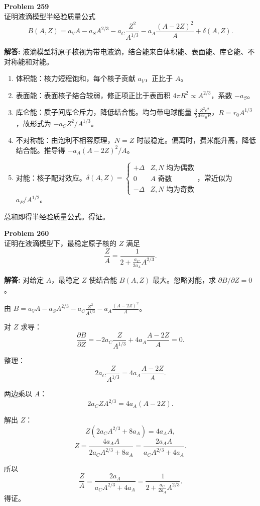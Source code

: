 \documentclass[12pt, a4paper, oneside]{ctexart}
\newenvironment{solution}{\par\noindent\textbf{解答:}\quad}{\par}
\begin{document}
\begin{mdframed}[backgroundcolor=gray!10, linewidth=0pt]
    \textbf{Problem 259} \\
    证明液滴模型半经验质量公式
    \[
    B(A, Z) = a_V A - a_S A^{2/3} - a_C \frac{Z^2}{A^{1/3}} - a_A \frac{(A-2Z)^2}{A} + \delta(A, Z).
    \]
\end{mdframed}
\begin{solution}
    液滴模型将原子核视为带电液滴，结合能来自体积能、表面能、库仑能、不对称能和对能。
    \begin{enumerate}
        \item 体积能：核力短程饱和，每个核子贡献 $a_V$，正比于 $A$。
        \item 表面能：表面核子结合较弱，修正项正比于表面积 $4\pi R^2 \propto A^{2/3}$，系数 $-a_S$。
        \item 库仑能：质子间库仑斥力，降低结合能。均匀带电球能量 $\frac{3}{5} \frac{Z^2 e^2}{4\pi\epsilon_0 R}$，$R = r_0 A^{1/3}$，故形式为 $-a_C Z^2 / A^{1/3}$。
        \item 不对称能：由泡利不相容原理，$N=Z$ 时最稳定。偏离时，费米能升高，降低结合能。推导得 $-a_A (A-2Z)^2 / A$。
        \item 对能：核子配对效应。$\delta(A, Z) = 
        \begin{cases}
            +\Delta & \text{$Z,N$ 均为偶数} \\
            0 & \text{$A$ 奇数} \\
            -\Delta & \text{$Z,N$ 均为奇数}
        \end{cases}$，常近似为 $a_P / A^{1/2}$。
    \end{enumerate}
    总和即得半经验质量公式。得证。
\end{solution}

\begin{mdframed}[backgroundcolor=gray!10, linewidth=0pt]
    \textbf{Problem 260} \\
    证明在液滴模型下，最稳定原子核的 $Z$ 满足
    \[
    \frac{Z}{A} = \frac{1}{2 + \frac{a_C}{2 a_A} A^{2/3}}.
    \]
\end{mdframed}
\begin{solution}
    对给定 $A$，最稳定 $Z$ 使结合能 $B(A,Z)$ 最大。忽略对能，求 $\partial B / \partial Z = 0$。

    由 $B = a_V A - a_S A^{2/3} - a_C \frac{Z^2}{A^{1/3}} - a_A \frac{(A-2Z)^2}{A}$。

    对 $Z$ 求导：
    \[
    \frac{\partial B}{\partial Z} = -2 a_C \frac{Z}{A^{1/3}} + 4 a_A \frac{A-2Z}{A} = 0.
    \]

    整理：
    \[
    2 a_C \frac{Z}{A^{1/3}} = 4 a_A \frac{A-2Z}{A}.
    \]

    两边乘以 $A$：
    \[
    2 a_C Z A^{2/3} = 4 a_A (A-2Z).
    \]

    解出 $Z$：
    \[
    Z (2 a_C A^{2/3} + 8 a_A) = 4 a_A A,
    \]
    \[
    Z = \frac{4 a_A A}{2 a_C A^{2/3} + 8 a_A} = \frac{2 a_A A}{a_C A^{2/3} + 4 a_A}.
    \]

    所以
    \[
    \frac{Z}{A} = \frac{2 a_A}{a_C A^{2/3} + 4 a_A} = \frac{1}{2 + \frac{a_C}{2 a_A} A^{2/3}}.
    \]
    得证。
\end{solution}
\end{document}
